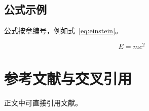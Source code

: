 \documentclass{muc-thesis}
\begin{document}
\section{公式示例}
公式按章编号，例如式~\eqref{eq:einstein}。

\begin{equation}
E = mc^2
\label{eq:einstein}
\end{equation}

\chapter{参考文献与交叉引用}
正文中可直接引用文献\cite{muc-guideline,lamport1994latex}。

\backmatter
\printbibliography[heading=bibintoc,title={参考文献}]
\end{document}
